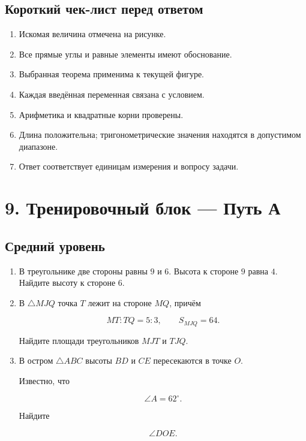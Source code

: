 \documentclass[a4paper,12pt]{article}
\begin{document}
\subsection{Короткий чек-лист перед ответом}

\begin{enumerate}

  \item
  Искомая величина отмечена на рисунке.

  \item
  Все прямые углы и равные элементы
  имеют обоснование.

  \item
  Выбранная теорема применима
  к текущей фигуре.

  \item
  Каждая введённая переменная
  связана с условием.

  \item
  Арифметика и квадратные корни проверены.

  \item
  Длина положительна;
  тригонометрические значения
  находятся в допустимом диапазоне.

  \item
  Ответ соответствует единицам измерения
  и вопросу задачи.

\end{enumerate}


\clearpage
\section{9. Тренировочный блок --- Путь А}

\subsection{Средний уровень}

\begin{enumerate}[label=\textbf{\arabic*.}]

  \item
  В треугольнике две стороны равны $9$ и $6$.
  Высота к стороне $9$ равна $4$.
  Найдите высоту к стороне $6$.

  \item
  В $\triangle MJQ$ точка $T$
  лежит на стороне $MQ$, причём

  \[
  MT:TQ=5:3,
  \qquad
  S_{MJQ}=64.
  \]

  Найдите площади треугольников
  $MJT$ и $TJQ$.

  \item
  В остром $\triangle ABC$
  высоты $BD$ и $CE$
  пересекаются в точке $O$.

  Известно, что

  \[
  \angle A=62^\circ.
  \]

  Найдите

  \[
  \angle DOE.
  \]

\end{enumerate}
\end{document}
